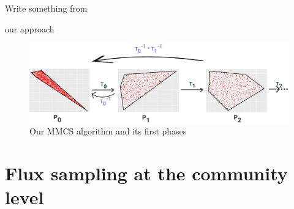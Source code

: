 Write something from \citeauthor{polanyi1968life}



our approach 

\begin{figure}
   \includegraphics[width=1.0\columnwidth]{figures/sampling_extra_phase_croped.png}
   \caption{Our MMCS algorithm and its first phases}
   \label{fig:mmcs}
\end{figure}


\section{Flux sampling at the community level}



